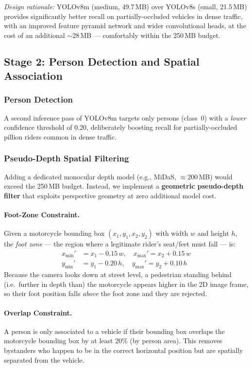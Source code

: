 \documentclass[12pt,a4paper]{article}
\begin{document}
\smallskip
\noindent\textit{Design rationale:} YOLOv8m (medium, 49.7\,MB) over YOLOv8s (small, 21.5\,MB)
provides significantly better recall on partially-occluded vehicles in dense traffic, with
an improved feature pyramid network and wider convolutional heads, at the cost of an additional
$\sim$28\,MB — comfortably within the 250\,MB budget.

\subsection{Stage 2: Person Detection and Spatial Association}

\subsubsection{Person Detection}
A second inference pass of YOLOv8m targets only persons (class~0) with a \emph{lower}
confidence threshold of 0.20, deliberately boosting recall for partially-occluded pillion
riders common in dense traffic.

\subsubsection{Pseudo-Depth Spatial Filtering}
Adding a dedicated monocular depth model (e.g., MiDaS, $\approx$200\,MB) would exceed the
250\,MB budget. Instead, we implement a \textbf{geometric pseudo-depth filter} that
exploits perspective geometry at zero additional model cost.

\paragraph{Foot-Zone Constraint.}
Given a motorcycle bounding box $(x_1, y_1, x_2, y_2)$ with width $w$ and height $h$,
the \emph{foot zone} — the region where a legitimate rider's seat/feet must fall — is:
\begin{align}
  x_{\min}' &= x_1 - 0.15\,w, \quad x_{\max}' = x_2 + 0.15\,w \\
  y_{\min}' &= y_1 - 0.20\,h, \quad y_{\max}' = y_2 + 0.10\,h
\end{align}
Because the camera looks down at street level, a pedestrian standing behind (i.e.\ further
in depth than) the motorcycle appears higher in the 2D image frame, so their foot position
falls \emph{above} the foot zone and they are rejected.

\paragraph{Overlap Constraint.}
A person is only associated to a vehicle if their bounding box overlaps the motorcycle
bounding box by at least 20\% (by person area). This removes bystanders who happen to be
in the correct horizontal position but are spatially separated from the vehicle.
\end{document}
